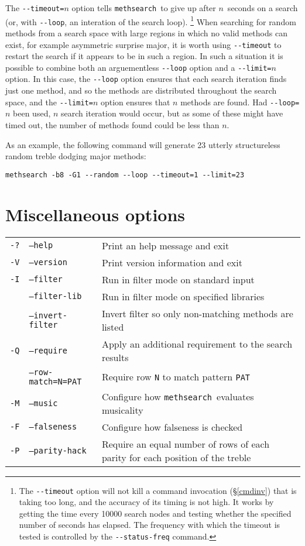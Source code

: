 \documentclass[a4paper,11pt,oneside]{book}
\makeatletter
\newcommand{\loid}[1]{\index{#1@{\hspace*{-\loptwidth}\texttt{--#1}}|ulink}}
\def\methsearch{\texttt{meth\-search}}
\newcommand{\sref}[1]{\hyperref[#1]{\S\ref{#1}}}
\makeatother
\begin{document}
The \verb+--timeout=+$n$ option\loid{timeout} tells \methsearch\ to give up
after $n$~seconds on a search (or, with \verb+--loop+, an interation of the 
search loop).%
\footnote{The \verb+--timeout+ option will not kill a command invocation
(\sref{cmdinv}) that is taking too long, and the accuracy of its timing
is not high.  It works by getting the time every 10000 search nodes and
testing whether the specified number of seconds has elapsed.  The frequency
with which the timeout is tested is controlled by the \verb+--status-freq+
command.}
When searching for random methods from a search space with large regions
in which no valid methods can exist, for example asymmetric surprise major,
it is worth using \verb+--timeout+ to restart the search if it 
appears to be in such a region.  In such a situation it is possible to
combine both an arguementless \verb+--loop+ option and a \verb+--limit=+$n$
option.  In this case, the \verb+--loop+ option ensures that each search
iteration finds just one method, and so the methods are distributed throughout
the search space, and the \verb+--limit=+$n$ option ensures that $n$ methods
are found.  Had \verb+--loop=+$n$ been used, $n$ search iteration would occur,
but as some of these might have timed out, the number of methods found
could be less than $n$.

As an example, the following command will generate 23 utterly structureless 
random treble dodging major methods:%
\begin{Verbatim}[commandchars=\%~~]
methsearch -b8 -G1 --random --loop --timeout=1 --limit=23
\end{Verbatim}


\section{Miscellaneous options}\label{misc_opt}

\begin{tabularx}{\textwidth}{llX}
\texttt{-?}&\texttt{--help}&Print an help message and exit\\
\texttt{-V}&\texttt{--version}&Print version information and exit\\
\texttt{-I}&\texttt{--filter}&Run in filter mode on standard input\\
&\texttt{--filter-lib}&Run in filter mode on specified libraries\\
&\texttt{--invert-filter}
                &Invert filter so only non-matching methods are listed\\
\texttt{-Q}&\texttt{--require} 
                &Apply an additional requirement to the search results\\
&\texttt{--row-match=N=PAT}
  &Require row \texttt{N} to match pattern \texttt{PAT}\\ 
\texttt{-M}&\texttt{--music}&Configure how \methsearch\ evaluates musicality\\
\texttt{-F}&\texttt{--falseness}&Configure how falseness is checked\\
\texttt{-P}&\texttt{--parity-hack}&Require an equal number of rows of each 
  parity for each position of the treble\\
\end{tabularx}
\end{document}
